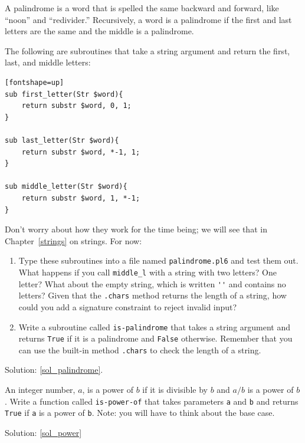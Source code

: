 \begin{exercise}
\label{palindrome}

A palindrome is a word that is spelled the same backward and
forward, like ``noon'' and ``redivider.''  Recursively, a word
is a palindrome if the first and last letters are the same
and the middle is a palindrome.

The following are subroutines that take a string argument and
return the first, last, and middle letters:

\begin{verbatim}[fontshape=up]
sub first_letter(Str $word){
    return substr $word, 0, 1;
}

sub last_letter(Str $word){
    return substr $word, *-1, 1;
}

sub middle_letter(Str $word){
    return substr $word, 1, *-1;
}
\end{verbatim}
%
Don't worry about how they work for the time being; we will see 
that in Chapter~\ref{strings} on strings. For now:

\begin{enumerate}

\item Type these subroutines into a file named {\tt palindrome.pl6}
and test them out.  What happens if you call {\tt middle_l} with
a string with two letters?  One letter?  What about the empty
string, which is written \verb"''" and contains no letters? 
Given that the {\tt .chars} method returns the length of a 
string, how could you add a signature constraint to reject invalid input?

\item Write a subroutine called \verb"is-palindrome" that takes
a string argument and returns {\tt True} if it is a palindrome
and {\tt False} otherwise.  Remember that you can use the
built-in method {\tt .chars} to check the length of a string.

\end{enumerate}

Solution: \ref{sol_palindrome}.

\end{exercise}

\begin{exercise}
\label{power}

An integer number, $a$, is a power of $b$ if it is divisible by $b$
and $a/b$ is a power of $b$.  Write a function called
\verb"is-power-of" that takes parameters {\tt a} and {\tt b}
and returns {\tt True} if {\tt a} is a power of {\tt b}.
Note: you will have to think about the base case.

Solution: \ref{sol_power}

\end{exercise}


